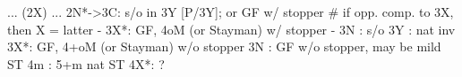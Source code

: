 ... (2X) ...
2N*->3C: s/o in 3Y [P/3Y]; or GF w/ stopper  # if opp. comp. to 3X, then X = latter
       - 3X*: GF, 4oM (or Stayman) w/ stopper
       - 3N : s/o
3Y : nat inv
3X*: GF, 4+oM (or Stayman) w/o stopper
3N : GF w/o stopper, may be mild ST
4m : 5+m nat ST
4X*: ?
